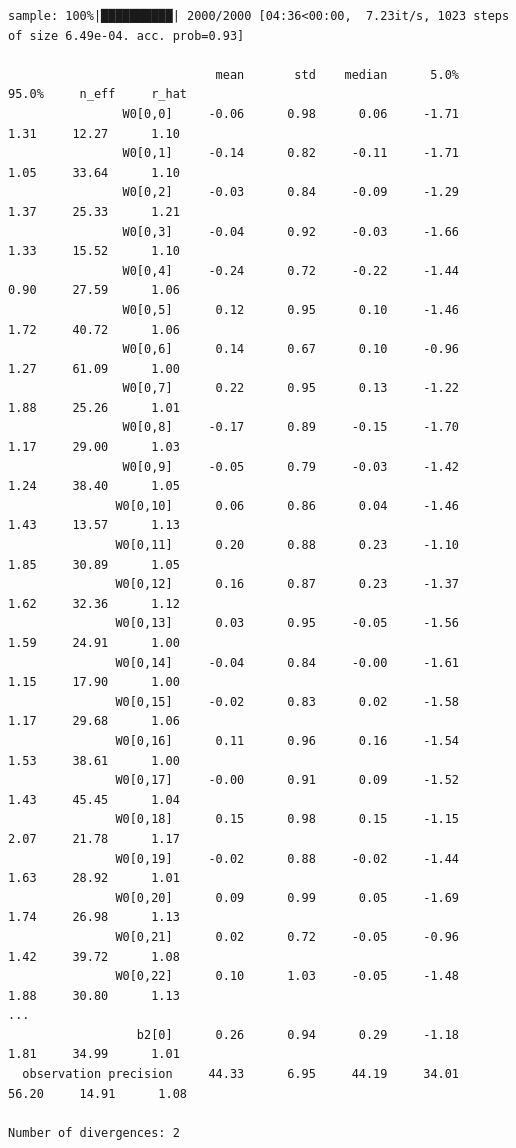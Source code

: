 \documentclass{article}
\begin{document}
\begin{lstlisting}
sample: 100%|██████████| 2000/2000 [04:36<00:00,  7.23it/s, 1023 steps of size 6.49e-04. acc. prob=0.93]

                             mean       std    median      5.0%     95.0%     n_eff     r_hat
                W0[0,0]     -0.06      0.98      0.06     -1.71      1.31     12.27      1.10
                W0[0,1]     -0.14      0.82     -0.11     -1.71      1.05     33.64      1.10
                W0[0,2]     -0.03      0.84     -0.09     -1.29      1.37     25.33      1.21
                W0[0,3]     -0.04      0.92     -0.03     -1.66      1.33     15.52      1.10
                W0[0,4]     -0.24      0.72     -0.22     -1.44      0.90     27.59      1.06
                W0[0,5]      0.12      0.95      0.10     -1.46      1.72     40.72      1.06
                W0[0,6]      0.14      0.67      0.10     -0.96      1.27     61.09      1.00
                W0[0,7]      0.22      0.95      0.13     -1.22      1.88     25.26      1.01
                W0[0,8]     -0.17      0.89     -0.15     -1.70      1.17     29.00      1.03
                W0[0,9]     -0.05      0.79     -0.03     -1.42      1.24     38.40      1.05
               W0[0,10]      0.06      0.86      0.04     -1.46      1.43     13.57      1.13
               W0[0,11]      0.20      0.88      0.23     -1.10      1.85     30.89      1.05
               W0[0,12]      0.16      0.87      0.23     -1.37      1.62     32.36      1.12
               W0[0,13]      0.03      0.95     -0.05     -1.56      1.59     24.91      1.00
               W0[0,14]     -0.04      0.84     -0.00     -1.61      1.15     17.90      1.00
               W0[0,15]     -0.02      0.83      0.02     -1.58      1.17     29.68      1.06
               W0[0,16]      0.11      0.96      0.16     -1.54      1.53     38.61      1.00
               W0[0,17]     -0.00      0.91      0.09     -1.52      1.43     45.45      1.04
               W0[0,18]      0.15      0.98      0.15     -1.15      2.07     21.78      1.17
               W0[0,19]     -0.02      0.88     -0.02     -1.44      1.63     28.92      1.01
               W0[0,20]      0.09      0.99      0.05     -1.69      1.74     26.98      1.13
               W0[0,21]      0.02      0.72     -0.05     -0.96      1.42     39.72      1.08
               W0[0,22]      0.10      1.03     -0.05     -1.48      1.88     30.80      1.13
...
                  b2[0]      0.26      0.94      0.29     -1.18      1.81     34.99      1.01
  observation precision     44.33      6.95     44.19     34.01     56.20     14.91      1.08

Number of divergences: 2
\end{lstlisting}
\end{document}
